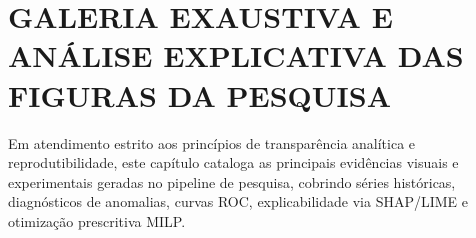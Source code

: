 \chapter{GALERIA EXAUSTIVA E ANÁLISE EXPLICATIVA DAS FIGURAS DA PESQUISA}
\label{cap:galeria}

Em atendimento estrito aos princípios de transparência analítica e reprodutibilidade, este capítulo cataloga as principais evidências visuais e experimentais geradas no pipeline de pesquisa, cobrindo séries históricas, diagnósticos de anomalias, curvas ROC, explicabilidade via SHAP/LIME e otimização prescritiva MILP.
